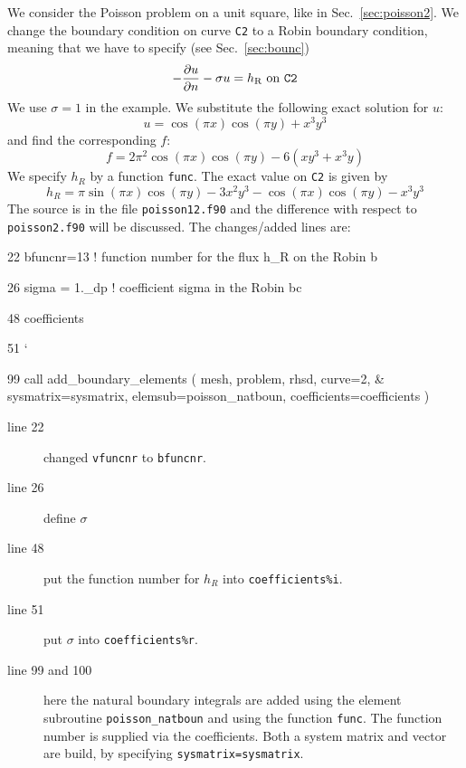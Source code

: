 \label{sec:poisson12}
We consider the Poisson problem on a unit square, like in
Sec.~\ref{sec:poisson2}. 
We change the boundary condition on curve \texttt{C2} to a Robin boundary
condition, meaning that we have to specify (see Sec.~\ref{sec:bounc})
\begin{equation}
   -\dfrac{\partial u}{\partial n} - \sigma u = h_\text{R}\text{ on \texttt{C2}}
\end{equation}
We use $\sigma=1$ in the example.
We substitute the following exact solution for $u$:
\begin{equation}
     u=\cos(\pi x)\cos(\pi y) + x^3y^3
\end{equation}
and find the corresponding $f$:
\begin{equation}
     f=2\pi^2\cos(\pi x)\cos(\pi y) - 6(xy^3+x^3y)
\end{equation}
We specify $h_R$ by a function \texttt{func}. The exact value on \texttt{C2}
is given by
\begin{equation}
   h_R= \pi\sin(\pi x)\cos(\pi y) - 3x^2y^3 - \cos(\pi x)\cos(\pi y) - x^3y^3
\end{equation}
The source is in the file \texttt{poisson12.f90} and the difference with respect
to \texttt{poisson2.f90} will be discussed. The changes/added lines are:
\bigskip
\begin{listing}{22}
    bfuncnr=13            ! function number for the flux h_R on the Robin b
\end{listing}
\bigskip
\begin{listing}{26}
    sigma = 1._dp     ! coefficient sigma in the Robin bc
\end{listing}
\bigskip
\begin{listing}{48}
    coefficients%
\end{listing}
\bigskip
\begin{listing}{51}
`\end{listing}
\bigskip
\begin{listing}{99}
  call add_boundary_elements ( mesh, problem, rhsd, curve=2, &
    sysmatrix=sysmatrix, elemsub=poisson_natboun, coefficients=coefficients )

\end{listing}
\begin{description}
   \item[line 22] changed \texttt{vfuncnr} to \texttt{bfuncnr}.
   \item[line 26] define $\sigma$
   \item[line 48] put the function number for $h_R$ into
\texttt{coefficients\%i}.
   \item[line 51] put $\sigma$ into \texttt{coefficients\%r}.
   \item[line 99 and 100]here the natural boundary integrals are
 added using the element subroutine
\texttt{poisson\_natboun}
and using the function \texttt{func}. The function number
is supplied via the coefficients. Both a system matrix and vector are build,
by specifying \texttt{sysmatrix=sysmatrix}.
\end{description}

